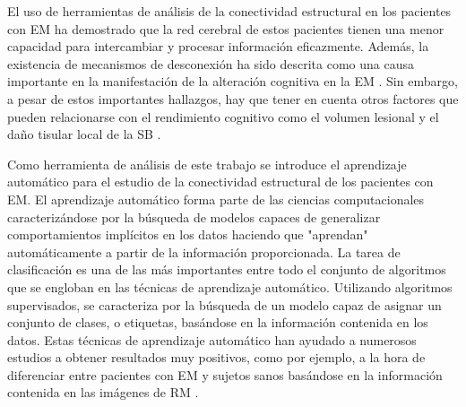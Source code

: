 El uso de herramientas de análisis de la conectividad estructural en los pacientes con EM ha demostrado que la red cerebral de estos pacientes tienen una menor capacidad para intercambiar y procesar información eficazmente. Además, la existencia de mecanismos de desconexión ha sido descrita como una causa importante en la manifestación de la alteración cognitiva en la EM \cite{Shu2011DiffusionSclerosis} \cite{Llufriu2017StructuralSclerosis} \cite{Bozzali2013AnatomicalSclerosis} \cite{Louapre2014BrainStudy} \cite{Dineen2009DisconnectionSclerosis}. Sin embargo, a pesar de estos importantes hallazgos, hay que tener en cuenta otros factores que pueden relacionarse con el rendimiento cognitivo como el volumen lesional y el daño tisular local de la SB \cite{Stellmann2017ReducedMS} \cite{Ouellette2018LesionSclerosis.}. 

Como herramienta de análisis de este trabajo se introduce el aprendizaje automático para el estudio de la conectividad estructural de los pacientes con EM. El aprendizaje automático forma parte de las ciencias computacionales caracterizándose por la búsqueda de modelos capaces de generalizar comportamientos implícitos en los datos haciendo que "aprendan" automáticamente a partir de la información proporcionada. La tarea de clasificación es una de las más importantes entre todo el conjunto de algoritmos que se engloban en las técnicas de aprendizaje automático. Utilizando algoritmos supervisados, se caracteriza por la búsqueda de un modelo capaz de asignar un conjunto de clases, o etiquetas, basándose en la información contenida en los datos. Estas técnicas de aprendizaje automático han ayudado a numerosos estudios a obtener resultados muy positivos, como por ejemplo, a la hora de diferenciar entre pacientes con EM y sujetos sanos basándose en la información contenida en las imágenes de RM \cite{Zhang2016ComparisonMachine}.
